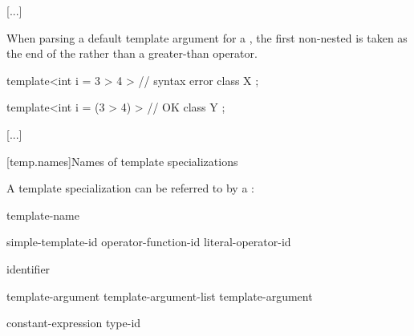 \documentclass{wg21}
\begin{document}
\textcolor{noteclr}{[...]}

%
\pnum
When parsing a default template argument
for a ,
the first non-nested \tcode{>} is taken as
the end of the 
rather than a greater-than operator.
\begin{example}
    \begin{codeblock}
        template<int i = 3 > 4 >        // syntax error
        class X {  };

        template<int i = (3 > 4) >      // OK
        class Y {  };
    \end{codeblock}
\end{example}




\textcolor{noteclr}{[...]}

[temp.names]{Names of template specializations}

\pnum
A template specialization  can be referred to by a
:

\begin{bnf}
    \br
    template-name \terminal{<}  \terminal{>}
\end{bnf}

\begin{bnf}
    \br
    simple-template-id\br
    operator-function-id \terminal{<}  \terminal{>}\br
    literal-operator-id \terminal{<}  \terminal{>}
\end{bnf}

\begin{bnf}
    \br
    identifier
\end{bnf}

\begin{bnf}
    \br
    template-argument \br
    template-argument-list \terminal{,} template-argument 
\end{bnf}

\begin{bnf}
    \br
    constant-expression\br
    type-id\br
    \br
\end{bnf}
\end{document}

